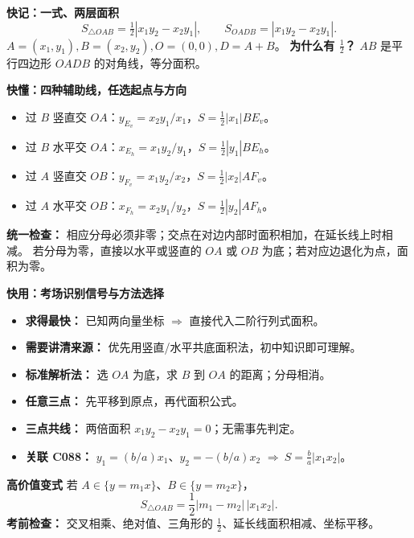\begin{summarybox}
\textbf{\textcolor{CSummary}{快记：一式、两层面积}}
\[
 \boxed{S_{\triangle OAB}=\tfrac12|x_1y_2-x_2y_1|},\qquad
 \boxed{S_{OADB}=|x_1y_2-x_2y_1|}.
\]
$A=(x_1,y_1),B=(x_2,y_2),O=(0,0),D=A+B$。
\textbf{为什么有 $\frac12$？} $AB$ 是平行四边形 $OADB$ 的对角线，等分面积。

\medskip
\textbf{\textcolor{CSummary}{快懂：四种辅助线，任选起点与方向}}
\begin{itemize}[leftmargin=*,itemsep=0.25em]
\item 过 $B$ 竖直交 $OA$：$y_{E_v}=x_2y_1/x_1$，$S=\frac12|x_1|BE_v$。
\item 过 $B$ 水平交 $OA$：$x_{E_h}=x_1y_2/y_1$，$S=\frac12|y_1|BE_h$。
\item 过 $A$ 竖直交 $OB$：$y_{F_v}=x_1y_2/x_2$，$S=\frac12|x_2|AF_v$。
\item 过 $A$ 水平交 $OB$：$x_{F_h}=x_2y_1/y_2$，$S=\frac12|y_2|AF_h$。
\end{itemize}
\textbf{统一检查：} 相应分母必须非零；交点在对边内部时面积相加，在延长线上时相减。
若分母为零，直接以水平或竖直的 $OA$ 或 $OB$ 为底；若对应边退化为点，面积为零。

\medskip
\textbf{\textcolor{CSummary}{快用：考场识别信号与方法选择}}
\begin{itemize}[leftmargin=*,itemsep=0.25em]
 \item \textbf{求得最快：} 已知两向量坐标 $\Rightarrow$ 直接代入二阶行列式面积。
 \item \textbf{需要讲清来源：} 优先用竖直/水平共底面积法，初中知识即可理解。
 \item \textbf{标准解析法：} 选 $OA$ 为底，求 $B$ 到 $OA$ 的距离；分母相消。
 \item \textbf{任意三点：} 先平移到原点，再代面积公式。
 \item \textbf{三点共线：} 两倍面积 $x_1y_2-x_2y_1=0$；无需事先判定。
 \item \textbf{关联 C088：} $y_1=(b/a)x_1$、$y_2=-(b/a)x_2$
 $\Rightarrow\ S=\frac ba|x_1x_2|$。
\end{itemize}

\medskip
\textbf{\textcolor{CSummary}{高价值变式}}
若 $A\in\{y=m_1x\}$、$B\in\{y=m_2x\}$，
\[
 \boxed{S_{\triangle OAB}=\frac12|m_1-m_2|\,|x_1x_2|.}
\]
\textbf{考前检查：} 交叉相乘、绝对值、三角形的 $\frac12$、延长线面积相减、坐标平移。
\end{summarybox}
